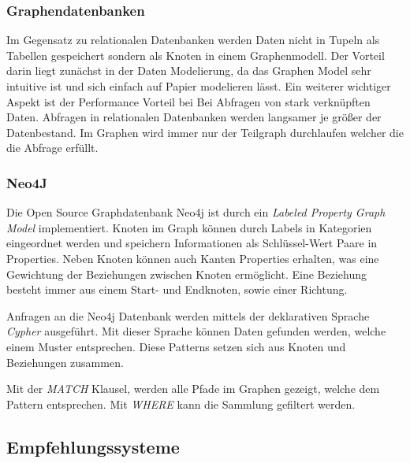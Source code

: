 	
	
	\subsubsection{Graphendatenbanken}	
	Im Gegensatz zu relationalen Datenbanken werden Daten nicht in Tupeln als Tabellen gespeichert sondern als Knoten in einem Graphenmodell. Der Vorteil darin liegt zunächst in der Daten Modelierung, da das Graphen Model sehr intuitive ist und sich einfach auf Papier modelieren lässt. 
	Ein weiterer wichtiger Aspekt ist der Performance Vorteil bei Bei Abfragen von stark verknüpften Daten. Abfragen in relationalen Datenbanken werden langsamer je größer der Datenbestand. Im Graphen wird immer nur der Teilgraph durchlaufen welcher die die Abfrage erfüllt.\cite[8]{robinson_webber_eifrem_2015}
	
	\subsubsection{Neo4J}
	
	Die Open Source Graphdatenbank Neo4j ist durch ein \textit{Labeled Property Graph Model} implementiert. Knoten im Graph können durch Labels in Kategorien eingeordnet werden und speichern Informationen als Schlüssel-Wert Paare in Properties. 
	Neben Knoten können auch Kanten Properties erhalten, was eine Gewichtung der Beziehungen zwischen Knoten ermöglicht. Eine Beziehung besteht immer aus einem Start- und Endknoten, sowie einer Richtung.\cite[26]{Robinson2015}
	
	Anfragen an die Neo4j Datenbank werden mittels der deklarativen Sprache \textit{Cypher} ausgeführt. Mit dieser Sprache können Daten gefunden werden, welche einem Muster  entsprechen. Diese Patterns setzen sich aus Knoten und Beziehungen zusammen. 
	
% 

Mit der \textit{MATCH} Klausel, werden alle Pfade im Graphen gezeigt, welche dem Pattern entsprechen. Mit \textit{WHERE} kann die Sammlung gefiltert werden.

\subsection{Empfehlungssysteme}

